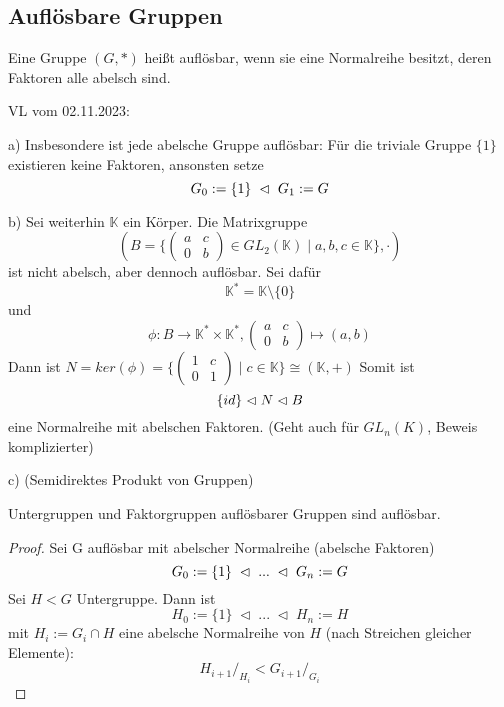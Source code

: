\documentclass[../main.tex]{subfiles}
\begin{document}
\subsection{Auflösbare Gruppen}
\begin{definition}
    Eine Gruppe $(G,*)$ heißt auflösbar, wenn sie eine Normalreihe besitzt, deren Faktoren alle abelsch sind.
\end{definition}
\begin{flushright}
VL vom 02.11.2023:
\end{flushright}
\begin{example}
    a) Insbesondere ist jede abelsche Gruppe auflösbar: Für die triviale Gruppe $\{1\}$ existieren keine Faktoren, ansonsten setze $$G_0 := \{1\} \; \vartriangleleft \; G_1 := G$$

    b) Sei weiterhin $\mathbb{K}$ ein Körper. Die Matrixgruppe $$(B = \{\begin{pmatrix} a & c \\ 0 & b \end{pmatrix} \in GL_2(\mathbb{K}) \mid a,b,c \in \mathbb{K}\}, \cdot)$$ ist nicht abelsch, aber dennoch auflösbar. Sei dafür $$\mathbb{K}^* = \mathbb{K}\setminus\{0\}$$ und $$\phi: B \rightarrow \mathbb{K}^* \times \mathbb{K}^*, \begin{pmatrix} a & c \\ 0 & b
    \end{pmatrix} \mapsto (a,b)$$ Dann ist $N = ker(\phi) = \{\begin{pmatrix}
        1 & c \\ 0 & 1
    \end{pmatrix} \mid c \in \mathbb{K}\} \cong (\mathbb{K},+)$ Somit ist $$\{id\} \vartriangleleft N \vartriangleleft B$$ eine Normalreihe mit abelschen Faktoren. (Geht auch für $GL_n(K)$, Beweis komplizierter)

    c) (Semidirektes Produkt von Gruppen) \TODO
\end{example}
\begin{theorem}\label{thm:ug:aufloesbar}\label{theo:1.12}
    Untergruppen und Faktorgruppen auflösbarer Gruppen sind auflösbar.
\end{theorem}
\begin{proof}
    Sei G auflösbar mit abelscher Normalreihe (abelsche Faktoren) 
    $$G_0 := \{1\} \; \vartriangleleft \; ... \; \vartriangleleft \; G_n := G$$
    Sei $H < G$ Untergruppe. Dann ist $$H_0 := \{1\} \; \triangleleft \; ... \; \triangleleft \; H_n := H$$ mit $H_i := G_i \cap H$ eine abelsche Normalreihe von $H$ (nach Streichen gleicher Elemente):
    $$H_{i+1}/_{H_i} < G_{i+1}/_{G_i}$$
\end{proof}
\end{document}
